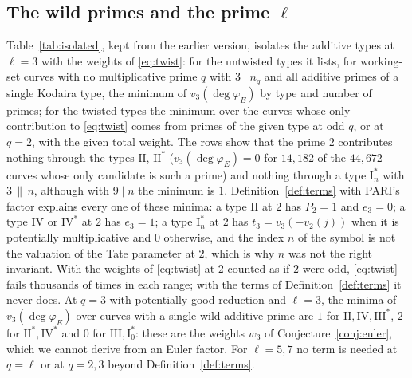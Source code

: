 \documentclass[11pt]{amsart}
\theoremstyle{definition}
\newcommand{\degphi}{\deg\varphi_E}
\begin{document}
\subsection{The wild primes and the prime \texorpdfstring{$\ell$}{l}}\label{sec:wild}
Table~\ref{tab:isolated}, kept from the earlier version, isolates the additive types at $\ell=3$ with the weights of \eqref{eq:twist}: for the untwisted types it lists, for working-set curves with no multiplicative prime $q$ with $3\mid n_q$ and all additive primes of a single Kodaira type, the minimum of $v_3(\degphi)$ by type and number of primes; for the twisted types the minimum over the curves whose only contribution to \eqref{eq:twist} comes from primes of the given type at odd $q$, or at $q=2$, with the given total weight. The rows show that the prime $2$ contributes nothing through the types $\mathrm{II}$, $\mathrm{II}^*$ ($v_3(\degphi)=0$ for $14{,}182$ of the $44{,}672$ curves whose only candidate is such a prime) and nothing through a type $\mathrm{I}_n^*$ with $3\,\|\,n$, although with $9\mid n$ the minimum is $1$. Definition~\ref{def:terms} with PARI's factor explains every one of these minima: a type $\mathrm{II}$ at $2$ has $P_2=1$ and $e_3=0$; a type $\mathrm{IV}$ or $\mathrm{IV}^*$ at $2$ has $e_3=1$; a type $\mathrm{I}_n^*$ at $2$ has $t_3=v_3(-v_2(j))$ when it is potentially multiplicative and $0$ otherwise, and the index $n$ of the symbol is not the valuation of the Tate parameter at $2$, which is why $n$ was not the right invariant. With the weights of \eqref{eq:twist} at $2$ counted as if $2$ were odd, \eqref{eq:twist} fails thousands of times in each range; with the terms of Definition~\ref{def:terms} it never does. At $q=3$ with potentially good reduction and $\ell=3$, the minima of $v_3(\degphi)$ over curves with a single wild additive prime are $1$ for $\mathrm{II},\mathrm{IV},\mathrm{III}^*$, $2$ for $\mathrm{II}^*,\mathrm{IV}^*$ and $0$ for $\mathrm{III},\mathrm{I}_0^*$: these are the weights $w_3$ of Conjecture~\ref{conj:euler}, which we cannot derive from an Euler factor. For $\ell=5,7$ no term is needed at $q=\ell$ or at $q=2,3$ beyond Definition~\ref{def:terms}.

\begin{table}[ht]
\centering\small

\caption{Minimum of $v_3(\degphi)$ (number of curves) over working-set curves with $E[3]$ irreducible whose only possible contributions at $3$ come from the primes named in the row, with the given number of primes (untwisted rows) or total weight of \eqref{eq:twist} (twisted rows).}\label{tab:isolated}
\end{table}
\end{document}
